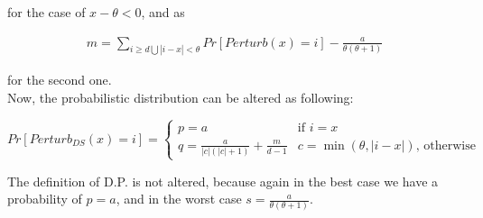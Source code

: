 for the case of $x - \theta < 0$, and as 

\begin{align*}
    m = \sum_{i \geq d \bigcup |i-x|<\theta} Pr[Perturb(x) = i] - \frac{a}{\theta(\theta+1)}
\end{align*}

for the second one.
\\\bigskip
Now, the probabilistic distribution can be altered as following: 


\begin{equation*}
    Pr[Perturb_{DS}(x) = i] =
	\begin{cases}
		p = a & \mbox{if } i = x \\
		q = \frac{a}{|c|(|c| + 1)} + \frac{m}{d - 1}  &  c = \min{(\theta, |i-x|)}  \mbox{, otherwise}	\end{cases}
\end{equation*}
 

The definition of D.P. is not altered, because again in the best case we have a probability of $p = a$, and in the worst case $s = \frac{a}{\theta(\theta+1)}$.

